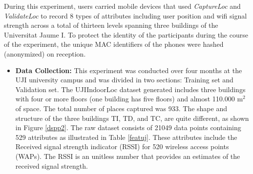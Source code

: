 During this experiment, users carried mobile devices that used \textit{CaptureLoc} and \textit{ValidateLoc} to record 8 types of attributes including user position and wifi signal strength across a total of thirteen levels spanning three buildings of the Universitat Jaume I. To protect the identity of the participants during the course of the experiment, the unique MAC identifiers of the phones were hashed (anonymized) on reception.
\begin{itemize}

\item\textbf{Data Collection:}
This experiment was conducted over four months at the UJI university campus and was divided in two sections: Training set and Validation set. The UJIIndoorLoc dataset generated includes three buildings with four or more floors (one building has five floors) and almost 110.000 m$^{2}$of space. The total number of places captured was 933. The shape and structure of the three buildings TI, TD, and TC, are quite different, as shown in Figure \ref{dspp2}. The raw dataset consists of 21049 data points containing 529 attributes as illustrated in Table \ref{featuj}. These attributes include the Received signal strength indicator (RSSI) for 520 wireless access points (WAPs). The RSSI is an unitless number that provides an estimates of the  received signal strength.



\end{itemize}
